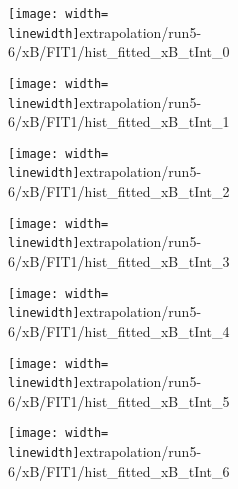 \begin{figure}
\begin{subfigure}{0.45\linewidth}
\texttt{[image: width=\\linewidth]}{extrapolation/run5-6/xB/FIT1/hist_fitted_xB_tInt_0}
\end{subfigure}
\begin{subfigure}{0.45\linewidth}
\texttt{[image: width=\\linewidth]}{extrapolation/run5-6/xB/FIT1/hist_fitted_xB_tInt_1}
\end{subfigure}
\begin{subfigure}{0.45\linewidth}
\texttt{[image: width=\\linewidth]}{extrapolation/run5-6/xB/FIT1/hist_fitted_xB_tInt_2}
\end{subfigure}
\begin{subfigure}{0.45\linewidth}
\texttt{[image: width=\\linewidth]}{extrapolation/run5-6/xB/FIT1/hist_fitted_xB_tInt_3}
\end{subfigure}
\begin{subfigure}{0.45\linewidth}
\texttt{[image: width=\\linewidth]}{extrapolation/run5-6/xB/FIT1/hist_fitted_xB_tInt_4}
\end{subfigure}
\begin{subfigure}{0.45\linewidth}
\texttt{[image: width=\\linewidth]}{extrapolation/run5-6/xB/FIT1/hist_fitted_xB_tInt_5}
\end{subfigure}
\begin{subfigure}{0.45\linewidth}
\texttt{[image: width=\\linewidth]}{extrapolation/run5-6/xB/FIT1/hist_fitted_xB_tInt_6}
\end{subfigure}
\end{figure}
